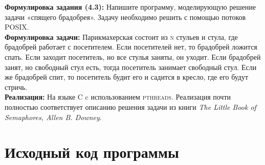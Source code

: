 





\pagebreak

\textbf{Формулировка задания (4.3):} Напишите программу, моделирующую решение задачи «спящего брадобрея». Задачу необходимо решить
с помощью потоков \textsc{POSIX}. \\

\textbf{Формулировка задачи:} Парикмахерская состоит из \textsc{n} стульев и стула, где брадобрей работает с посетителем. Если
посетителей нет, то брадобрей ложится спать. Если заходит посетитель, но все стулья заняты, он уходит. Если брадобрей занят, но
свободный стул есть, тогда посетитель занимает свободный стул. Если же брадобрей спит, то посетитель будит его и садится в кресло,
где его будут стричь. \\ 

\textbf{Реализация:} На языке \textsc{C} c использованием \textsc{pthreads}. Реализация почти полностью соответствует описанию
решения задачи из книги \textit{The Little Book of Semaphores, Allen B. Downey}.

\section*{Исходный код программы}
\lstset{language=c, caption=Barbershop problem simulation program source, %
label=source-code, basicstyle=\footnotesize,%
numbers=left, numberstyle=\footnotesize, numbersep=5pt, frame=single, breaklines=true, breakatwhitespace=false,%
inputencoding=utf8x}




